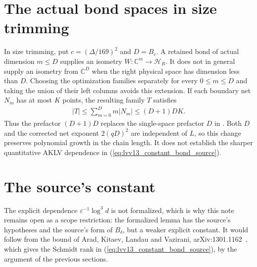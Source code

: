 \documentclass{article}
\begin{document}
\section{The actual bond spaces in size trimming}

In size trimming, put $c=(\Delta/169)^2$ and $D=B_c$. A retained bond of
actual dimension $m\le D$ supplies an isometry
$W:\mathbb C^m\to\mathcal H_R$. It does not in general supply an isometry
from $\mathbb C^D$ when the right physical space has dimension less than
$D$. Choosing the optimization families separately for every
$0\le m\le D$ and taking the union of their left columns avoids this
extension. If each boundary net $N_m$ has at most $K$ points, the resulting
family $T$ satisfies
\begin{align}
    |T|\le\sum_{m=0}^{D}m|N_m|\le(D+1)DK.
    \label{eq:lvv13_actual_bond_union}
\end{align}
Thus the prefactor $(D+1)D$ replaces the single-space prefactor $D$ in
\cite[Claim~2.7]{Landau2015Polynomial}. Both $D$ and the corrected net
exponent $2(qD)^2$ are independent of $L$, so this change preserves
polynomial growth in the chain length. It does not establish the sharper
quantitative AKLV dependence in
(\ref{eq:lvv13_constant_bond_source}).

\section{The source's constant}

The explicit dependence $\varepsilon^{-1}\log^3d$ is not formalized, which is
why this note remains open as a scope restriction: the formalized lemma has the
source's hypotheses and the source's form of $B_\delta$, but a weaker explicit
constant. It would
follow from the bound of Arad, Kitaev, Landau and Vazirani,
arXiv:1301.1162~\cite{Arad2013AreaLaw}, which gives the Schmidt rank in
(\ref{eq:lvv13_constant_bond_source}), by the argument of the previous
sections.
\end{document}
